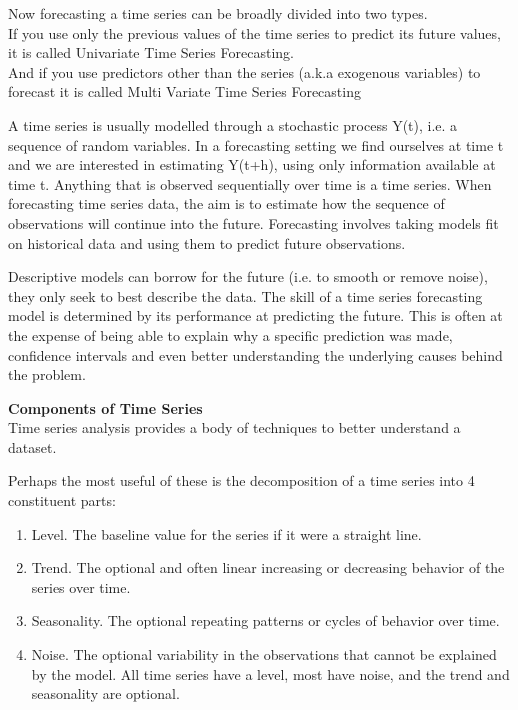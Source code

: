 \documentclass[12pt]{report}
\begin{document}
Now forecasting a time series can be broadly divided into two types.\\

If you use only the previous values of the time series to predict its future values, it is called Univariate Time Series Forecasting.\\

And if you use predictors other than the series (a.k.a exogenous variables) to forecast it is called Multi Variate Time Series Forecasting


A time series is usually modelled through a stochastic process Y(t), i.e. a sequence of random variables. In a forecasting setting we find ourselves at time t and we are interested in estimating Y(t+h), using only information available at time t.\cite{13}
Anything that is observed sequentially over time is a time series.
When forecasting time series data, the aim is to estimate how the sequence of observations will continue into the future.
Forecasting involves taking models fit on historical data and using them to predict future observations.

Descriptive models can borrow for the future (i.e. to smooth or remove noise), they only seek to best describe the data.
The skill of a time series forecasting model is determined by its performance at predicting the future. This is often at the expense of being able to explain why a specific prediction was made, confidence intervals and even better understanding the underlying causes behind the problem.

\textbf{Components of Time Series} \\
Time series analysis provides a body of techniques to better understand a dataset.

Perhaps the most useful of these is the decomposition of a time series into 4 constituent parts:

\begin{enumerate}
  \item Level. The baseline value for the series if it were a straight line.
  \item Trend. The optional and often linear increasing or decreasing behavior of the series over time.
  \item Seasonality. The optional repeating patterns or cycles of behavior over time.
  \item Noise. The optional variability in the observations that cannot be explained by the model.
All time series have a level, most have noise, and the trend and seasonality are optional.

\end{enumerate}
\end{document}
